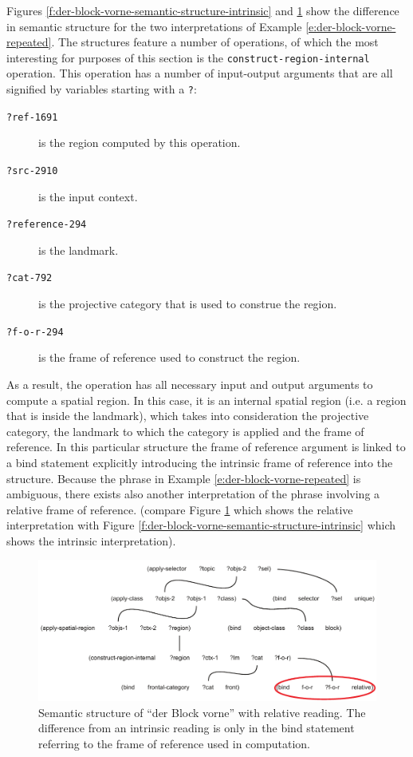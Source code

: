 Figures \ref{f:der-block-vorne-semantic-structure-intrinsic} 
and \ref{f:der-block-vorne-semantic-structure-relative} show the difference in semantic
structure for the two interpretations of Example \ref{e:der-block-vorne-repeated}. 
The structures feature a number of operations, of which the most interesting for purposes 
of this section is the {\footnotesize\tt construct-region-internal} operation. 
This operation has a number of input-output arguments that are all signified
by variables starting with a {\footnotesize\tt ?}:
\begin{description}
\item[{\footnotesize\tt ?ref-1691}] is the region computed by this operation.
\item[{\footnotesize\tt ?src-2910}] is the input context.
\item[{\footnotesize\tt ?reference-294}] is the landmark. 
\item[{\footnotesize\tt ?cat-792}] is the projective category that is used to construe the region.
\item[{\footnotesize\tt ?f-o-r-294}] is the frame of reference used to construct the region.
\end{description}
As a result, the operation has all necessary input and output arguments to compute 
a spatial region. In this case, it is an internal spatial region (i.e. a region that 
is inside the landmark), which takes into consideration the projective
category, the landmark to which the category is applied and the frame of reference.
In this particular structure the frame of reference argument is linked to a bind 
statement explicitly introducing the intrinsic frame of reference into the structure. 
Because the phrase in Example \ref{e:der-block-vorne-repeated} is ambiguous, there exists 
also another interpretation of the phrase involving a relative frame of reference. 
(compare Figure \ref{f:der-block-vorne-semantic-structure-relative} which shows
the relative interpretation with Figure \ref{f:der-block-vorne-semantic-structure-intrinsic} 
which shows the intrinsic interpretation).

\begin{figure}
\begin{center}
\includegraphics[width=\columnwidth]{figs/der-block-vorne-semantic-structure-relative}
\caption[Semantic structure of ``der Block vorne'' (the block in front) -- relative]{
Semantic structure of ``der Block vorne'' with relative reading. The 
difference from an intrinsic reading is only in the bind statement referring 
to the frame of reference used in computation.}
\label{f:der-block-vorne-semantic-structure-relative}
\end{center}
\end{figure}

